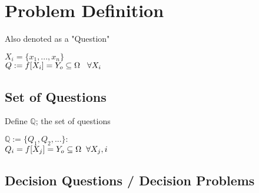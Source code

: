 \documentclass[11pt]{article}
\def \loop {\ensuremath{\rotatebox[origin=c]{-90}{$\circlearrowright$}}}
\def \nestedloop {\ensuremath{\rotatebox[origin=c]{-90}{$\circlearrowright$}}^n}
\begin{document}
















\newpage
\section{Problem Definition}
Also denoted as a "Question"
\begin{center}
$
X_i = \{x_1,...,x_n\}
$
\\ \vspace{2mm}
$
Q := f \lbrack X_i \rbrack = Y_{o} \subseteq \Omega \hspace{3mm} \forall X_i
$
\end{center}
\subsection{Set of Questions}
Define $\mathbb{Q}$; the set of questions
\begin{center}
$
\mathbb{Q} := \{Q_1,Q_2,...\}:
$
\\ \vspace{2mm}
$
Q_i = f[X_j] = Y_o \subseteq \Omega \hspace{2mm} \forall X_j, i
$
\end{center}

\subsection{Decision Questions / Decision Problems}
\end{document}
